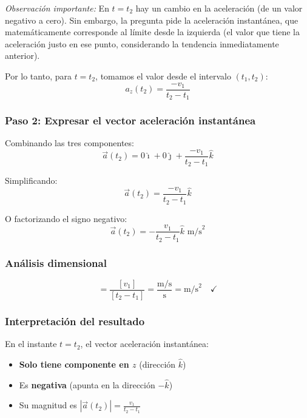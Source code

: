 \documentclass[12pt, a4paper]{article}
\begin{document}
\textit{Observación importante:} En $t = t_2$ hay un cambio en la aceleración (de un valor negativo a cero). Sin embargo, la pregunta pide la aceleración instantánea, que matemáticamente corresponde al límite desde la izquierda (el valor que tiene la aceleración justo en ese punto, considerando la tendencia inmediatamente anterior).

Por lo tanto, para $t = t_2$, tomamos el valor desde el intervalo $(t_1, t_2)$:
\begin{equation}
a_z(t_2) = \frac{-v_1}{t_2 - t_1}
\end{equation}

\subsubsection*{Paso 2: Expresar el vector aceleración instantánea}

Combinando las tres componentes:
\begin{equation}
\vec{a}(t_2) = 0\hat{\imath} + 0\hat{\jmath} + \frac{-v_1}{t_2 - t_1}\hat{k}
\end{equation}

Simplificando:
\begin{equation}
\vec{a}(t_2) = \frac{-v_1}{t_2 - t_1}\hat{k}
\end{equation}

O factorizando el signo negativo:
\begin{equation}
\boxed{\vec{a}(t_2) = -\frac{v_1}{t_2 - t_1}\hat{k} \text{ m/s}^2}
\end{equation}

\subsubsection*{Análisis dimensional}
\begin{equation}
[\vec{a}(t_2)] = \frac{[v_1]}{[t_2 - t_1]} = \frac{\text{m/s}}{\text{s}} = \text{m/s}^2 \quad \checkmark
\end{equation}

\subsubsection*{Interpretación del resultado}

En el instante $t = t_2$, el vector aceleración instantánea:
\begin{itemize}
    \item \textbf{Solo tiene componente en $z$} (dirección $\hat{k}$)
    \item Es \textbf{negativa} (apunta en la dirección $-\hat{k}$)
    \item Su magnitud es $|\vec{a}(t_2)| = \frac{v_1}{t_2 - t_1}$
\end{itemize}
\end{document}
